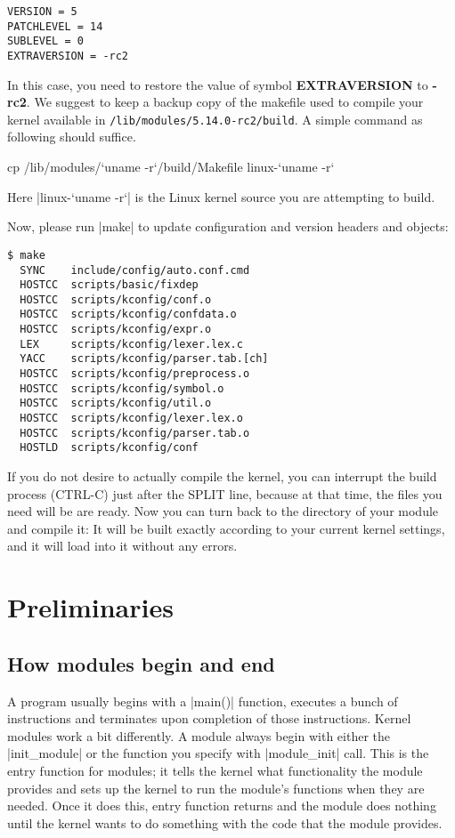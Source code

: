 \documentclass[10pt, oneside]{book}
\begin{document}
\begin{verbatim}
VERSION = 5
PATCHLEVEL = 14
SUBLEVEL = 0
EXTRAVERSION = -rc2
\end{verbatim}

In this case, you need to restore the value of symbol \textbf{EXTRAVERSION} to \textbf{-rc2}.
We suggest to keep a backup copy of the makefile used to compile your kernel available in \verb|/lib/modules/5.14.0-rc2/build|.
A simple command as following should suffice.
\begin{codebash}
cp /lib/modules/`uname -r`/build/Makefile linux-`uname -r`
\end{codebash}
Here \sh|linux-`uname -r`| is the Linux kernel source you are attempting to build.

Now, please run \sh|make| to update configuration and version headers and objects:

\begin{verbatim}
$ make
  SYNC    include/config/auto.conf.cmd
  HOSTCC  scripts/basic/fixdep
  HOSTCC  scripts/kconfig/conf.o
  HOSTCC  scripts/kconfig/confdata.o
  HOSTCC  scripts/kconfig/expr.o
  LEX     scripts/kconfig/lexer.lex.c
  YACC    scripts/kconfig/parser.tab.[ch]
  HOSTCC  scripts/kconfig/preprocess.o
  HOSTCC  scripts/kconfig/symbol.o
  HOSTCC  scripts/kconfig/util.o
  HOSTCC  scripts/kconfig/lexer.lex.o
  HOSTCC  scripts/kconfig/parser.tab.o
  HOSTLD  scripts/kconfig/conf
\end{verbatim}

If you do not desire to actually compile the kernel, you can interrupt the build process (CTRL-C) just after the SPLIT line, because at that time, the files you need will be are ready.
Now you can turn back to the directory of your module and compile it: It will be built exactly according to your current kernel settings, and it will load into it without any errors.

\section{Preliminaries}
\subsection{How modules begin and end}
\label{sec:module_init_exit}
A program usually begins with a \cpp|main()| function, executes a bunch of instructions and terminates upon completion of those instructions.
Kernel modules work a bit differently. A module always begin with either the \cpp|init_module| or the function you specify with \cpp|module_init| call.
This is the entry function for modules; it tells the kernel what functionality the module provides and sets up the kernel to run the module's functions when they are needed.
Once it does this, entry function returns and the module does nothing until the kernel wants to do something with the code that the module provides.
\end{document}
